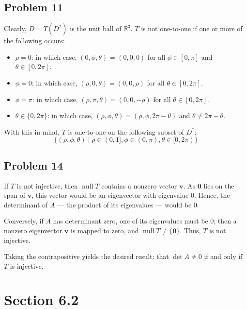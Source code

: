 \documentclass[11pt]{article}
\renewcommand{\vec}[1]{\mathbf{#1}}
\begin{document}

\subsection*{Problem 11}

Clearly, $D = T(D^{*})$ is $\boxed{\text{the unit ball of $\mathbb{R}^{3}$}}$. $T$ is not one-to-one if one or more of the following occurs:
\begin{itemize}
	\item $\rho = 0$: in which case, $(0, \phi, \theta)$ = $(0, 0, 0)$ for all $\phi \in [0, \pi]$ and $\theta \in [0, 2\pi]$.
	\item $\phi = 0$: in which case, $(\rho, 0, \theta) = (0, 0, \rho)$ for all $\theta \in [0, 2\pi]$.
	\item $\phi = \pi$: in which case, $(\rho, \pi, \theta) = (0, 0, -\rho)$ for all $\theta \in [0, 2\pi]$.
	\item $\theta \in \{ 0, 2\pi \}$: in which case, $(\rho, \phi, \theta) = (\rho, \phi, 2\pi - \theta)$ and $\theta \ne 2\pi - \theta$.
\end{itemize}
With this in mind, $T$ is one-to-one on the following subset of $D^{*}$:
\[
	\boxed{\{ (\rho, \phi, \theta) \mid \rho \in (0, 1], \phi \in (0, \pi), \theta \in [0, 2\pi) \}}
\]


\subsection*{Problem 14}

If $T$ is not injective, then $\operatorname{null} T$ contains a nonzero vector $\vec{v}$. As $\vec{0}$ lies on the span of $\vec{v}$, this vector would be an eigenvector with eigenvalue $0$. Hence, the determinant of $A$ --- the product of its eigenvalues --- would be $0$. 

Conversely, if $A$ has determinant zero, one of its eigenvalues must be $0$; then a nonzero eigenvector $\vec{v}$ is mapped to zero, and $\operatorname{null} T \ne \{ \vec{0} \}$. Thus, $T$ is not injective.

Taking the contrapositive yields the desired result: that $\det A \ne 0$ if and only if $T$ is injective.


\section{Section 6.2}
\end{document}
